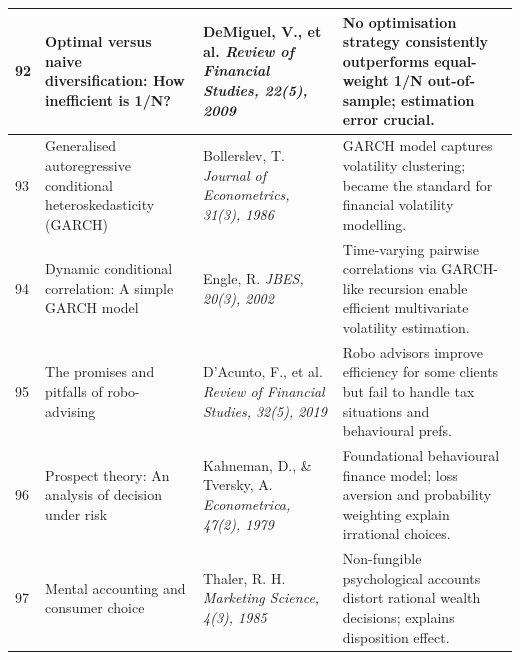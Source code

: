 \documentclass[12pt,a4paper,oneside]{report}
\theoremstyle{definition}
\theoremstyle{remark}
\begin{document}
\begin{center}
\begin{longtable}{|p{0.8cm}|p{4.2cm}|>{\raggedright\arraybackslash}p{4cm}|p{4.5cm}|}
92 & Optimal versus naive diversification: How inefficient is 1/N? \cite{DeMiguel2009Portfolio} & DeMiguel, V., et al. \newline\newline \textit{Review of Financial Studies, 22(5), 2009} & No optimisation strategy consistently outperforms equal-weight 1/N out-of-sample; estimation error crucial. \\ \hline

93 & Generalised autoregressive conditional heteroskedasticity (GARCH) \cite{Bollerslev1986GARCH} & Bollerslev, T. \newline\newline \textit{Journal of Econometrics, 31(3), 1986} & GARCH model captures volatility clustering; became the standard for financial volatility modelling. \\ \hline

94 & Dynamic conditional correlation: A simple GARCH model \cite{Engle2002DCC} & Engle, R. \newline\newline \textit{JBES, 20(3), 2002} & Time-varying pairwise correlations via GARCH-like recursion enable efficient multivariate volatility estimation. \\ \hline

95 & The promises and pitfalls of robo-advising \cite{DacuntoRoboadvisor2019} & D'Acunto, F., et al. \newline\newline \textit{Review of Financial Studies, 32(5), 2019} & Robo advisors improve efficiency for some clients but fail to handle tax situations and behavioural prefs. \\ \hline

96 & Prospect theory: An analysis of decision under risk \cite{Kahneman1979ProspectTheory} & Kahneman, D., \& Tversky, A. \newline\newline \textit{Econometrica, 47(2), 1979} & Foundational behavioural finance model; loss aversion and probability weighting explain irrational choices. \\ \hline

97 & Mental accounting and consumer choice \cite{Thaler1985MentalAccounting} & Thaler, R. H. \newline\newline \textit{Marketing Science, 4(3), 1985} & Non-fungible psychological accounts distort rational wealth decisions; explains disposition effect. \\ \hline


\end{longtable}
\end{center}
\end{document}
